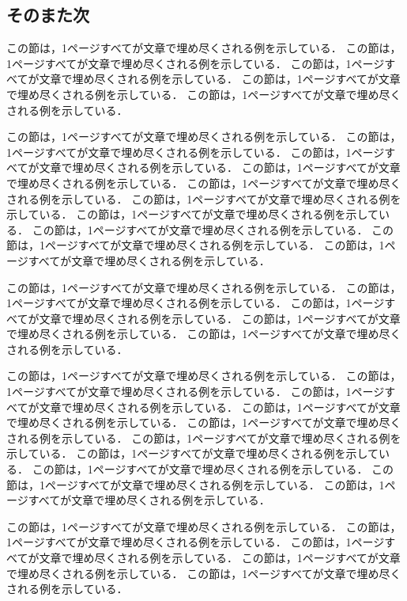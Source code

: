 \subsection{そのまた次}

この節は，1ページすべてが文章で埋め尽くされる例を示している．
この節は，1ページすべてが文章で埋め尽くされる例を示している．
この節は，1ページすべてが文章で埋め尽くされる例を示している．
この節は，1ページすべてが文章で埋め尽くされる例を示している．
この節は，1ページすべてが文章で埋め尽くされる例を示している．

この節は，1ページすべてが文章で埋め尽くされる例を示している．
この節は，1ページすべてが文章で埋め尽くされる例を示している．
この節は，1ページすべてが文章で埋め尽くされる例を示している．
この節は，1ページすべてが文章で埋め尽くされる例を示している．
この節は，1ページすべてが文章で埋め尽くされる例を示している．
この節は，1ページすべてが文章で埋め尽くされる例を示している．
この節は，1ページすべてが文章で埋め尽くされる例を示している．
この節は，1ページすべてが文章で埋め尽くされる例を示している．
この節は，1ページすべてが文章で埋め尽くされる例を示している．
この節は，1ページすべてが文章で埋め尽くされる例を示している．

この節は，1ページすべてが文章で埋め尽くされる例を示している．
この節は，1ページすべてが文章で埋め尽くされる例を示している．
この節は，1ページすべてが文章で埋め尽くされる例を示している．
この節は，1ページすべてが文章で埋め尽くされる例を示している．
この節は，1ページすべてが文章で埋め尽くされる例を示している．

この節は，1ページすべてが文章で埋め尽くされる例を示している．
この節は，1ページすべてが文章で埋め尽くされる例を示している．
この節は，1ページすべてが文章で埋め尽くされる例を示している．
この節は，1ページすべてが文章で埋め尽くされる例を示している．
この節は，1ページすべてが文章で埋め尽くされる例を示している．
この節は，1ページすべてが文章で埋め尽くされる例を示している．
この節は，1ページすべてが文章で埋め尽くされる例を示している．
この節は，1ページすべてが文章で埋め尽くされる例を示している．
この節は，1ページすべてが文章で埋め尽くされる例を示している．
この節は，1ページすべてが文章で埋め尽くされる例を示している．

この節は，1ページすべてが文章で埋め尽くされる例を示している．
この節は，1ページすべてが文章で埋め尽くされる例を示している．
この節は，1ページすべてが文章で埋め尽くされる例を示している．
この節は，1ページすべてが文章で埋め尽くされる例を示している．
この節は，1ページすべてが文章で埋め尽くされる例を示している．

